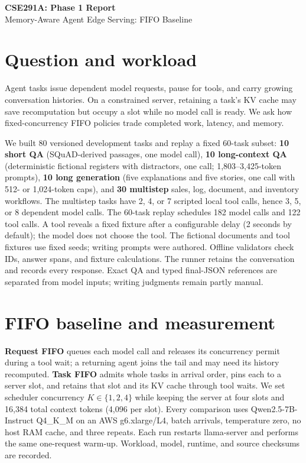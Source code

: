 \documentclass[10pt,letterpaper]{article}
\begin{document}
\begin{center}
    {\Large \textbf{CSE291A: Phase 1 Report}}\\[-1pt]
    {\small Memory-Aware Agent Edge Serving: FIFO Baseline}
\end{center}
\vspace{-8pt}

\section{Question and workload}
Agent tasks issue dependent model requests, pause for tools, and carry growing
conversation histories. On a constrained server, retaining a task's KV cache
may save recomputation but occupy a slot while no model call is ready. We ask
how fixed-concurrency FIFO policies trade completed work, latency, and memory.

We built 80 versioned development tasks and replay a fixed 60-task subset:
\textbf{10 short QA} (SQuAD-derived passages, one model call),
\textbf{10 long-context QA} (deterministic fictional registers with distractors,
one call; 1,803--3,425-token prompts),
\textbf{10 long generation} (five explanations and five stories, one call with
512- or 1,024-token caps), and \textbf{30 multistep} sales, log, document, and
inventory workflows. The multistep tasks have 2, 4, or 7 scripted local tool
calls, hence 3, 5, or 8 dependent model calls. The 60-task replay schedules
182 model calls and 122 tool calls. A tool reveals a fixed fixture after a
configurable delay (2 seconds by default); the model does not choose the tool.
The fictional documents and tool fixtures use fixed seeds; writing prompts
were authored. Offline validators check IDs, answer spans, and fixture
calculations. The runner retains the conversation and records every response.
Exact QA and typed final-JSON references are separated from model inputs;
writing judgments remain partly manual.

\section{FIFO baseline and measurement}
\textbf{Request FIFO} queues each model call and releases its concurrency
permit during a tool wait; a returning agent joins the tail and may need its
history recomputed. \textbf{Task FIFO} admits whole tasks in arrival order,
pins each to a server slot, and retains that slot and its KV cache through
tool waits. We set scheduler concurrency $K\in\{1,2,4\}$ while keeping the
server at four slots and 16,384 total context tokens (4,096 per slot).
Every comparison uses Qwen2.5-7B-Instruct Q4\_K\_M on an AWS g6.xlarge/L4,
batch arrivals, temperature zero, no host RAM cache, and three repeats.
Each run restarts llama-server and performs the same one-request warm-up.
Workload, model, runtime, and source checksums are recorded.
\end{document}
